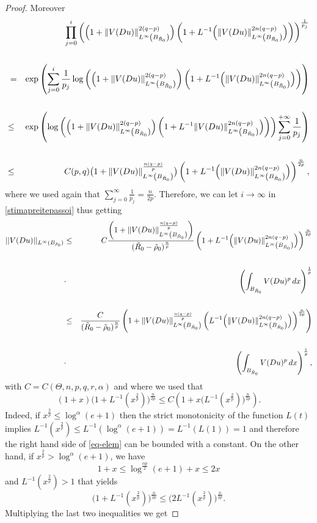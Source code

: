 \documentclass[12pt]{amsart}
\theoremstyle{definition}
\numberwithin{equation}{section}
\numberwithin{equation}{section}
\begin{document}
{\begin{proof}
Moreover
\begin{eqnarray*}
&&\displaystyle{\prod_{j=0}^{i}}\left({\Big(1+\|V(Du)\|^{2(q-p)}_{L^\infty\left(B_{ \tilde R_0}\right)}\Big)}\left(1+{{L}^{-1} \Big(\|V(Du)\|^{2n(q-p)}_{L^\infty\left(B_{ \tilde R_0}\right)}\Big)}\right)\right)^{\frac{1}{p_j}}\cr\cr
 &=&\exp\left(\sum_{j=0}^i \frac{1}{p_j}\log\left({\Big(1+\|V(Du)\|^{2(q-p)}_{L^\infty\left(B_{ \tilde R_0}\right)}}\right)\left(1+{{L}^{-1} \Big(\|V(Du)\|^{2n(q-p)}_{L^\infty\left(B_{ \tilde R_0}\right)}\Big)}\right)\right)
	\cr\cr
	&{\le}& \exp\left(\log\left({\Big(1+\|V(Du)\|^{2(q-p)}_{L^\infty\left(B_{ \tilde R_0}\right)}\Big)}\left(1+{{L}^{-1} \|V(Du)\|^{2n(q-p)}_{L^\infty\left(B_{ \tilde R_0}\right)}\Big)}\right)\right)\sum_{j=0}^{+\infty} \frac{1}{p_j}\right)\cr\cr
 &{\le}& {C(p,q)\big(1+\|V(Du)\|^{\frac{n(q-p)}{p}}_{L^\infty\left(B_{ \tilde R_0}\right)}\big)}\left(1+{L}^{-1} \Big(\|V(Du)\|^{2n(q-p)}_{L^\infty\left(B_{ \tilde R_0}\right)}\Big)\right)^{\frac{n}{2p}},
\end{eqnarray*}
where we used again that $\sum_{j=0}^{{\infty}}\frac{1}{p_j}= \frac{n}{2 p} $.
Therefore, we can let $i\to \infty$ in \eqref{stimapreitepassoi} thus getting
\begin{eqnarray}\label{stimaquasifin}
	||V(Du)||_{L^{\infty}(B_{\tilde\rho_0})} &\le&  C\frac{\left (1+ \|V(Du)\|^{\frac{n(q-p)}{p}}_{L^\infty\left(B_{ \tilde R_0}\right)} \right )}{( \tilde R_0- \tilde \rho_0 )^{\frac{n}{p}}}\left(1+{L}^{-1} \Big(\|V(Du)\|^{2n(q-p)}_{L^\infty\left(B_{ \tilde R_0}\right)}\Big)\right)^{\frac{n}{2p}} \cr\cr  
    &\cdot& \left(\int_{B_{ \tilde R_0}}V(Du)^{p}
\, dx\right)^{\frac{1}{p}}\cr\cr
&\le& \frac{C}{( \tilde R_0- \tilde \rho_0 )^{\frac{n}{p}}}\left(1+\|V(Du)\|^{\frac{n(q-p)}{p}}_{L^\infty\left(B_{ \tilde R_0}\right)}\left({L}^{-1} \Big(\|V(Du)\|^{2n(q-p)}_{L^\infty\left(B_{ \tilde R_0}\right)}\Big)\right)^{\frac{n}{2p}}\right)\cr\cr  
    &\cdot& \left(\int_{B_{ \tilde R_0}}V(Du)^{p}
\, dx\right)^{\frac{1}{p}},
\end{eqnarray}
with $C=C(\Theta,n,p,{q},r,\alpha)$ and where we used that \begin{equation}\label{eq-elem}
 (1+x)\big(1+L^{-1}(x^{\frac{2}{p}})\big)^{\frac{n}{2p}}\le C\left(1+x\big(L^{-1}(x^{\frac{2}{p}})\big)^{\frac{n}{2p}}\right).   
\end{equation}
Indeed, if $x^{\frac{2}{p}}\le \log^{{\alpha}}(e+1)$ then the strict monotonicity of the function $L(t)$ implies  $L^{-1}(x^{\frac{2}{p}})\le L^{-1}(\log^{{\alpha}}(e+1))= {L^{-1} (L(1)) = 1}$ and therefore the right hand side of \eqref{eq-elem} can be bounded with a constant. On the other hand, if $x^{\frac{2}{p}}> \log^{{\alpha}}(e+1)$, we have $$1+x\le \log^{\frac{{{\alpha}}p}{2}}(e+1)+x\le 2x$$ and $L^{-1}(x^{\frac{2}{p}})>1$ that yields $$\big(1+L^{-1}(x^{\frac{2}{p}})\big)^{\frac{n}{2p}}\le \big(2L^{-1}(x^{\frac{2}{p}})\big)^{\frac{n}{2p}}.$$ Multiplying the last two inequalities we get

\end{proof}}
\end{document}

